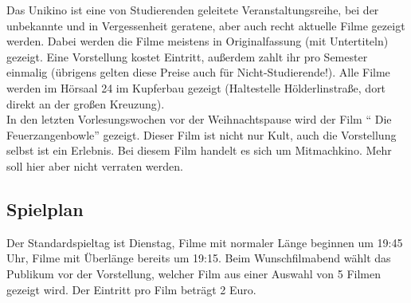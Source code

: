 Das Unikino ist eine von Studierenden geleitete Veranstaltungsreihe, bei der
unbekannte und in Vergessenheit geratene, aber auch recht aktuelle Filme
gezeigt werden. Dabei werden die Filme meistens in Originalfassung (mit
Untertiteln) gezeigt. Eine Vorstellung kostet  Eintritt, außerdem zahlt
ihr pro Semester einmalig  (übrigens gelten diese Preise auch für
Nicht-Studierende!). Alle Filme werden im Hörsaal 24 im Kupferbau gezeigt
(Haltestelle Hölderlinstraße, dort direkt an der großen Kreuzung).\\ 
In den letzten Vorlesungswochen vor der Weihnachtspause wird der Film 
"` Die Feu\-er\-zang\-en\-bow\-le"' gezeigt. Dieser Film ist nicht nur Kult,
auch die Vorstellung selbst ist ein Erlebnis. Bei diesem Film handelt es sich 
um Mitmachkino. Mehr soll hier aber nicht verraten werden.


\vspace*{-1em}

\subsection*{Spielplan}
Der Standardspieltag ist Dienstag, Filme mit normaler Länge beginnen um 19:45
Uhr, Filme mit Überlänge bereits um 19:15. Beim Wunschfilmabend wählt das
Publikum vor der Vorstellung, welcher Film aus einer Auswahl von 5 Filmen
gezeigt wird. Der Eintritt pro Film beträgt 2 Euro. 

\renewcommand{\arraystretch}{1.2}

